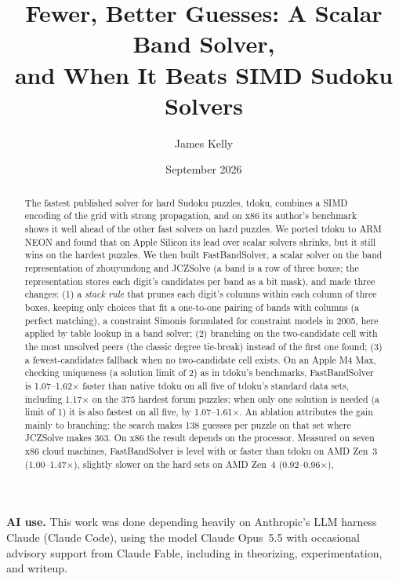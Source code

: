 \documentclass[11pt]{article}
\title{Fewer, Better Guesses: A Scalar Band Solver,\\and When It Beats SIMD Sudoku Solvers}
\author{James Kelly}
\date{September 2026}
\theoremstyle{definition}
\theoremstyle{plain}
\begin{document}
\maketitle

\begin{center}
\begin{minipage}{0.85\textwidth}
\small\textbf{AI use.} This work was done depending heavily on Anthropic's LLM harness Claude (Claude Code), using the model Claude Opus~5.5 with occasional advisory support from Claude Fable, including in theorizing, experimentation, and writeup.
\end{minipage}
\end{center}


\begin{abstract}
The fastest published solver for hard Sudoku puzzles, tdoku, combines a SIMD encoding of the grid with strong propagation, and on x86 its author's benchmark shows it well ahead of the other fast solvers on hard puzzles. We ported tdoku to ARM NEON and
found that on Apple Silicon its lead over scalar solvers shrinks, but it still wins on the hardest puzzles. We then
built FastBandSolver, a scalar solver on the band representation of zhouyundong and JCZSolve (a band is a row of
three boxes; the representation stores each digit's candidates per band as a bit mask), and made three changes:
(1) a \emph{stack rule} that prunes each digit's columns within each column of three boxes, keeping only choices that fit a one-to-one pairing of bands with columns (a perfect matching), a constraint Simonis
formulated for constraint models in 2005, here applied by table lookup in a band solver; (2) branching on the
two-candidate cell with the most unsolved peers (the classic degree tie-break) instead of the first one found;
(3) a fewest-candidates fallback when no two-candidate cell exists. On an Apple M4 Max, checking uniqueness (a
solution limit of 2) as in tdoku's benchmarks, FastBandSolver is 1.07--1.62$\times$ faster than native tdoku on all
five of tdoku's standard data sets, including 1.17$\times$ on the 375 hardest forum puzzles; when only one solution is needed (a limit of
1) it is also fastest on all five, by 1.07--1.61$\times$. An ablation attributes
the gain mainly to branching: the search makes 138 guesses per puzzle on that set where JCZSolve makes 363. On x86 the result depends on the processor. Measured on seven x86 cloud machines, FastBandSolver is level with or
faster than tdoku on AMD Zen~3 (1.00--1.47$\times$), slightly slower on the hard sets on AMD Zen~4 (0.92--0.96$\times$),

\end{abstract}
\end{document}
